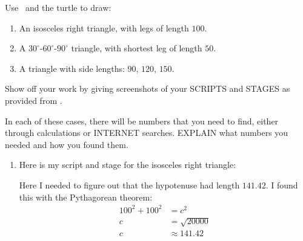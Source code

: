 \documentclass[handout,noauthor,nooutcomes]{../ximera}
\begin{document}
\begin{question}
  Use \snap\ and the turtle to draw:
  \begin{enumerate}
  \item An isosceles right triangle, with legs of length $100$.
  \item A $30^\circ$-$60^\circ$-$90^\circ$ triangle, with shortest leg of length $50$.
  \item A triangle with side lengths: $90$, $120$, $150$.
  \end{enumerate}
  Show off your work by giving screenshots of your SCRIPTS and STAGES as
  provided from \snap.

  
  In each of these cases, there will be numbers that you need to find,
  either through calculations or INTERNET searches. EXPLAIN what
  numbers you needed and how you found them.
  
  \begin{freeResponse}
    \begin{enumerate}
    \item Here is my script and stage for the isosceles right
      triangle:
      \begin{center}
        \qquad
      \end{center}
      Here I needed to figure out that the hypotenuse had length
      $141.42$. I found this with the Pythagorean theorem:
      \begin{align*}
      100^2 + 100^2 &= c^2\\
      c &= \sqrt{20000}\\
      c &\approx 141.42
      \end{align*}
      

\end{enumerate}
\end{freeResponse}
\end{question}
\end{document}
